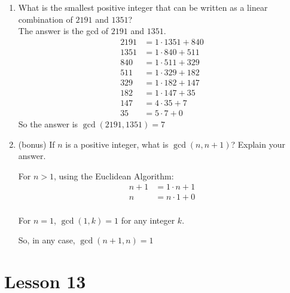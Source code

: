 \documentclass[11pt]{amsart}
\begin{document}
\begin{enumerate}
\item What is the smallest positive integer that can be written as a linear combination of $2191$ and  $1351$?\\[3pt]
{\color{blue}
The answer is the gcd of $2191$ and $1351$.
 \begin{align*}
 2191 &= 1\cdot1351+840 \\
 1351 &= 1\cdot840+511 \\
  840 &= 1\cdot511+329\\
  511 &= 1\cdot329+182\\
  329  &= 1\cdot182+147 \\
  182  &=1\cdot147+35\\
  147 &= 4\cdot 35 +7\\
  35 &= 5\cdot 7 + 0
\end{align*}
So the answer is $\gcd(2191,1351) =7$\\[5pt]
}


\item (bonus) If $n$ is a positive integer, what is $\gcd(n,n+1)$? Explain your answer.\\[3pt]
{\color{blue}
For $n>1$, using the Euclidean Algorithm:
\begin{align*}
 n+1 &= 1\cdot n+1 \\
  n &= n\cdot1+0 \\
\end{align*}

For $n=1$, $\gcd(1,k) = 1$ for any integer $k$.

So, in any case, $\gcd(n+1,n) = 1$\\[5pt]
}


\end{enumerate}

\section{Lesson 13}
\end{document}
